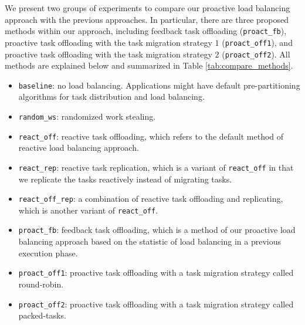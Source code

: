 We present two groups of experiments to compare our proactive load balancing approach with the previous approaches. In particular, there are three proposed methods within our approach, including feedback task offloading (\texttt{proact\_fb}), proactive task offloading with the task migration strategy $1$ (\texttt{proact\_off1}), and proactive task offloading with the task migration strategy $2$ (\texttt{proact\_off2}). All methods are explained below and summarized in Table \ref{tab:compare_methods}.
\begin{itemize}
    \item \texttt{baseline}: no load balancing. Applications might have default pre-partitioning algorithms for task distribution and load balancing.
    \item \texttt{random\_ws}: randomized work stealing. 
    \item \texttt{react\_off}: reactive task offloading, which refers to the default method of reactive load balancing approach.
    \item \texttt{react\_rep}: reactive task replication, which is a variant of \texttt{react\_off} in that we replicate the tasks reactively instead of migrating tasks.
    \item \texttt{react\_off\_rep}: a combination of reactive task offloading and replicating, which is another variant of \texttt{react\_off}.
    \item \texttt{proact\_fb}: feedback task offloading, which is a method of our proactive load balancing approach based on the statistic of load balancing in a previous execution phase.
    \item \texttt{proact\_off1}: proactive task offloading with a task migration strategy called round-robin.
    \item \texttt{proact\_off2}: proactive task offloading with a task migration strategy called packed-tasks.
\end{itemize}


